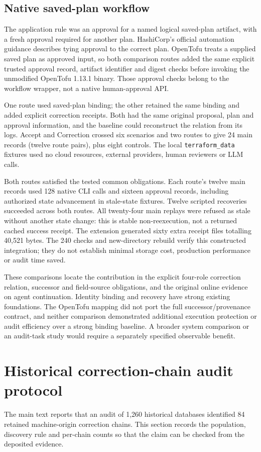 \documentclass[10pt,a4paper]{article}
\begin{document}
\subsection*{Native saved-plan workflow}
The application rule was an approval for a named logical saved-plan artifact, with a fresh approval required for another plan. HashiCorp's official automation guidance describes tying approval to the correct plan. OpenTofu treats a supplied saved plan as approved input, so both comparison routes added the same explicit trusted approval record, artifact identifier and digest checks before invoking the unmodified OpenTofu 1.13.1 binary. Those approval checks belong to the workflow wrapper, not a native human-approval API.

One route used saved-plan binding; the other retained the same binding and added explicit correction receipts. Both had the same original proposal, plan and approval information, and the baseline could reconstruct the relation from its logs. Accept and Correction crossed six scenarios and two routes to give 24 main records (twelve route pairs), plus eight controls. The local \texttt{terraform\_data} fixtures used no cloud resources, external providers, human reviewers or LLM calls.

Both routes satisfied the tested common obligations. Each route's twelve main records used 128 native CLI calls and sixteen approval records, including authorized state advancement in stale-state fixtures. Twelve scripted recoveries succeeded across both routes. All twenty-four main replays were refused as stale without another state change: this is stable non-reexecution, not a returned cached success receipt. The extension generated sixty extra receipt files totalling 40,521 bytes. The 240 checks and new-directory rebuild verify this constructed integration; they do not establish minimal storage cost, production performance or audit time saved.

These comparisons locate the contribution in the explicit four-role correction relation, successor and field-source obligations, and the original online evidence on agent continuation. Identity binding and recovery have strong existing foundations. The OpenTofu mapping did not port the full successor/provenance contract, and neither comparison demonstrated additional execution protection or audit efficiency over a strong binding baseline. A broader system comparison or an audit-task study would require a separately specified observable benefit.

\section{Historical correction-chain audit protocol}
The main text reports that an audit of 1,260 historical databases identified 84 retained machine-origin correction chains. This section records the population, discovery rule and per-chain counts so that the claim can be checked from the deposited evidence.
\end{document}
